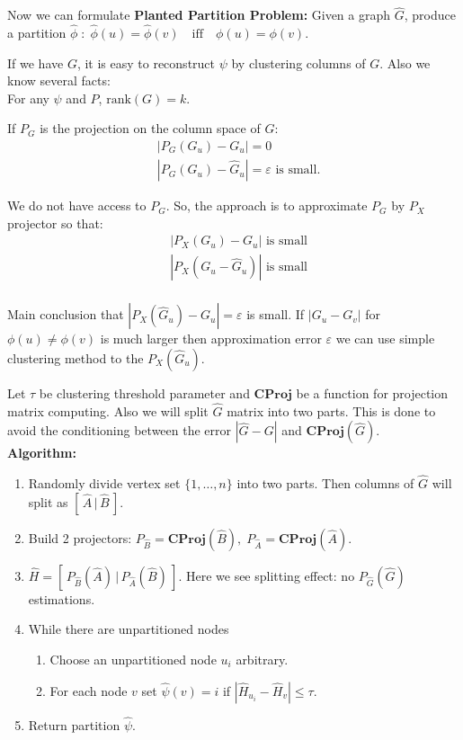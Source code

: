 \documentclass{ITaSconf}
\begin{document}
	Now we can formulate \textbf{Planted Partition Problem:} Given a graph $\hat G$, produce a partition $\hat\phi \; : \; \hat\phi(u) = \hat\phi(v) \quad \mathrm{iff} \quad \phi(u) = \phi(v)$.
	
	If we have $G$, it is easy to reconstruct $\psi$ by clustering columns of $G$. Also we know several facts:\\
	
	For any $\psi$ and $P$, $\mathrm{rank}(G) = k$. 
	
	If $P_G$ is the projection on the column space of $G$:
	\begin{align*}
	&\left|  P_G(G_u) - G_u \right| = 0 \\
	&\left|  P_G(G_u) - \hat G_u \right| = \varepsilon \text{ is small}.
	\end{align*}
	
	We do not have access to $P_G$. So, the approach is to approximate $P_G$ by $P_X$ projector so that:
	\begin{align*}
	&\left|P_X(G_u) - G_u \right| \text{ is small}\\
	&\left|P_X(G_u - \hat G_u) \right| \text{ is small}\\
	\end{align*}
	
	Main conclusion that $\left| P_X(\hat G_u) - G_u \right| = \varepsilon$ is small. If $|G_u - G_v|$ for $\phi(u) \ne \phi(v)$ is much larger then approximation error $\varepsilon$ we can use simple clustering method to the $P_X(\hat G_u)$.
	
	Let $\tau$ be clustering threshold parameter and $\mathbf{CProj}$ be a function for projection matrix computing. Also we will split $ \hat G$ matrix into two parts. This is done to avoid the conditioning between the error $| \hat G - G |$ and $\mathbf{CProj}(\hat G)$.\\
	
	\textbf{Algorithm:}
	\begin{enumerate}
		\item Randomly divide vertex set $\{1,\dots, n\}$ into two parts. Then columns of $\hat G$ will split as $\left[\,\hat A\, |\, \hat B\, \right]$.
		\item Build 2 projectors: $P_{\hat B} = \mathbf{CProj}(\hat B), \; P_{\hat A} = \mathbf{CProj}(\hat A)$.
		\item $\hat H = \left[\,P_{\hat B}(\hat A)\,|\,P_{\hat A}(\hat B)\,  \right]$. Here we see splitting effect: no $P_{\hat G}(\hat G)$ estimations.
		\item While there are unpartitioned nodes
		\begin{enumerate}
			\item Choose an unpartitioned node $u_i$ arbitrary.
			\item For each node $v$ set $\hat \psi (v) = i$ if $ | \hat H_{u_i} - \hat H_v | \le \tau$.
		\end{enumerate}
		\item Return partition $\hat \psi$.
		
	\end{enumerate}
	
\end{document}
